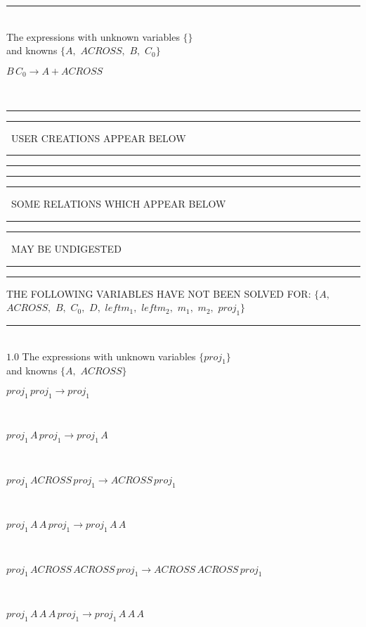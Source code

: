 \documentclass[rep10,leqno]{report}
\begin{document}
\rule[3pt]{6in}{.7pt}\\
The expressions with unknown variables $\{\}$\\
and knowns $\{A,
$ $
ACROSS,
$ $
B,
$ $
C_{0}\}$\smallskip\\
\begin{minipage}{6in}
$
B\,
 C_{0}\rightarrow A + ACROSS
$
\end{minipage}\\
\rule[2pt]{6in}{1pt}\hfil\break
\rule[2.5pt]{1.701in}{1pt}
\ USER CREATIONS APPEAR BELOW\ 
\rule[2.5pt]{1.701in}{1pt}\hfil\break
\rule[2pt]{6in}{1pt}\hfil\break
\rule[2pt]{6in}{4pt}\hfil\break
\rule[2pt]{1.45in}{4pt}
\ SOME RELATIONS WHICH APPEAR BELOW\ 
\rule[2pt]{1.45in}{4pt}\hfil\break
\rule[2pt]{2.18in}{4pt}
\ MAY BE UNDIGESTED\ 
\rule[2pt]{2.18in}{4pt}\hfil\break
\rule[2pt]{6in}{4pt}\hfil\break
THE FOLLOWING VARIABLES HAVE NOT BEEN SOLVED FOR:\hfil\break
$\{A,
$ $
ACROSS,
$ $
B,
$ $
C_{0},
$ $
D,
$ $
leftm_{1},
$ $
leftm_{2},
$ $
m_{1},
$ $
m_{2},
$ $
proj_{1}\}$
\smallskip\\
\rule[3pt]{6in}{.7pt}\\
$1.0$  The expressions with unknown variables $\{proj_{1}\}$\\
and knowns $\{A,
$ $
ACROSS\}$\smallskip\\
\begin{minipage}{6in}
$
proj_{1}\,
 proj_{1}\rightarrow proj_{1}
$
\end{minipage}\medskip \\
\begin{minipage}{6in}
$
proj_{1}\,
 A\,
 proj_{1}\rightarrow proj_{1}\,
 A
$
\end{minipage}\medskip \\
\begin{minipage}{6in}
$
proj_{1}\,
 ACROSS\,
 proj_{1}\rightarrow ACROSS\,
 proj_{1}
$
\end{minipage}\medskip \\
\begin{minipage}{6in}
$
proj_{1}\,
 A\,
 A\,
 proj_{1}\rightarrow proj_{1}\,
 A\,
 A
$
\end{minipage}\medskip \\
\begin{minipage}{6in}
$
proj_{1}\,
 ACROSS\,
 ACROSS\,
 proj_{1}\rightarrow ACROSS\,
 ACROSS\,
 proj_{1}
$
\end{minipage}\medskip \\
\begin{minipage}{6in}
$
proj_{1}\,
 A\,
 A\,
 A\,
 proj_{1}\rightarrow proj_{1}\,
 A\,
 A\,
 A
$
\end{minipage}\medskip \\
\end{document}
